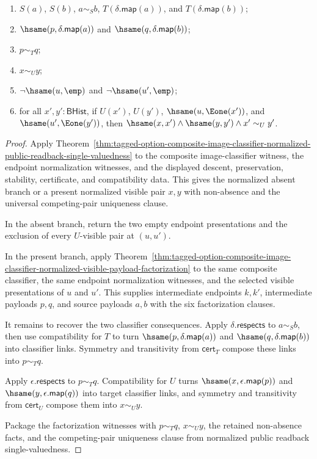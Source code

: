 \begin{theorem}
\begin{enumerate}
\item $S(a)$, $S(b)$, $a\sim_S b$,
$T(\delta.\mathsf{map}(a))$, and $T(\delta.\mathsf{map}(b))$;
\item $\hsame(p,\delta.\mathsf{map}(a))$ and
$\hsame(q,\delta.\mathsf{map}(b))$;
\item $p\sim_T q$;
\item $x\sim_U y$;
\item $\neg\hsame(u,\emp)$ and $\neg\hsame(u',\emp)$;
\item for all $x',y':\mathsf{BHist}$, if $U(x')$, $U(y')$,
$\hsame(u,\Eone(x'))$, and $\hsame(u',\Eone(y'))$, then
$\hsame(x,x')\land \hsame(y,y')\land x'\sim_U y'$.
\end{enumerate}
\end{theorem}
\begin{proof}
Apply
Theorem~\ref{thm:tagged-option-composite-image-classifier-normalized-public-readback-single-valuedness}
to the composite image-classifier witness, the endpoint normalization witnesses,
and the displayed descent, preservation, stability, certificate, and
compatibility data. This gives the normalized absent branch or a present
normalized visible pair $x,y$ with non-absence and the universal
competing-pair uniqueness clause.

In the absent branch, return the two empty endpoint presentations and the
exclusion of every $U$-visible pair at $(u,u')$.

In the present branch, apply
Theorem~\ref{thm:tagged-option-composite-image-classifier-normalized-visible-payload-factorization}
to the same composite classifier, the same endpoint normalization witnesses, and
the selected visible presentations of $u$ and $u'$. This supplies intermediate
endpoints $k,k'$, intermediate payloads $p,q$, and source payloads $a,b$ with
the six factorization clauses.

It remains to recover the two classifier consequences. Apply
$\delta.\mathsf{respects}$ to $a\sim_S b$, then use compatibility for $T$ to
turn $\hsame(p,\delta.\mathsf{map}(a))$ and
$\hsame(q,\delta.\mathsf{map}(b))$ into classifier links. Symmetry and
transitivity from $\mathsf{cert}_T$ compose these links into $p\sim_T q$.

Apply $\epsilon.\mathsf{respects}$ to $p\sim_T q$. Compatibility for $U$ turns
$\hsame(x,\epsilon.\mathsf{map}(p))$ and
$\hsame(y,\epsilon.\mathsf{map}(q))$ into target classifier links, and symmetry
and transitivity from $\mathsf{cert}_U$ compose them into $x\sim_U y$.

Package the factorization witnesses with $p\sim_T q$, $x\sim_U y$, the retained
non-absence facts, and the competing-pair uniqueness clause from normalized
public readback single-valuedness.
\end{proof}

